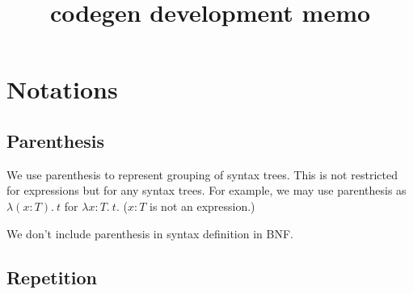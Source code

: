 \documentclass[a4paper,fleqn]{article}
\title{codegen development memo}
\newcommand{\lam}[2]{\lambda #1.\:#2}
\begin{document}
\maketitle

\section{Notations}\label{sec:notations}

\subsection{Parenthesis}

We use parenthesis to represent grouping of syntax trees.
This is not restricted for expressions but for any syntax trees.
For example, we may use parenthesis as $\lam{(x{:}T)}{t}$ for $\lam{x{:}T}{t}$.
($x{:}T$ is not an expression.)

We don't include parenthesis in syntax definition in BNF.

\subsection{Repetition}
\end{document}
